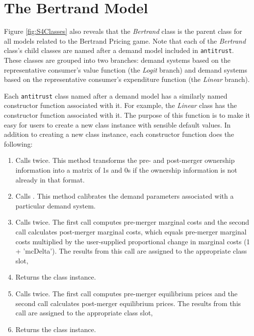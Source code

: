 \documentclass[11pt,numbers=noenddot,pointlessnumbers]{scrreprt}
\newcommand{\atr}{{\tt antitrust}}
\numberwithin{equation}{section}
\begin{document}
\section{The  Bertrand Model}
Figure \ref{fig:S4Classes} also reveals that the \emph{Bertrand} class
is the parent class for all models related to the Bertrand Pricing
game. Note that each of the \emph{Bertrand} class's
child classes are named after a demand model included in \atr{}. These
classes are grouped into two branches: demand systems based on the
representative consumer's value function (the \emph{Logit} branch) and
demand systems based on the representative consumer's expenditure
function (the \emph{Linear} branch).

Each \atr{} class named after a demand model has a similarly named
constructor function associated with it. For example, the
\emph{Linear} class has the \verb@linear@ constructor function
associated with it. The purpose of this function is to make it easy
for users to create a new class instance with sensible default
values. In addition to creating a new class instance, each constructor function does the following:

\begin{enumerate}
  \item Calls \verb@ownerToMatrix@ twice. This method transforms the
    pre- and post-merger ownership information into a matrix of 1s and
    0s if the ownership information is not already in that format.
  \item Calls \verb@calcSlopes@. This method calibrates the demand
    parameters associated with a particular demand system.
  \item Calls \verb@calcMC@ twice. The first call computes
    pre-merger marginal costs and the second call calculates
    post-merger marginal costs, which equals
    pre-merger  marginal costs multiplied by the user-supplied
    proportional change in marginal costs (1 + 'mcDelta'). The results from this call are
    assigned to the appropriate class slot,
  \item Returns the class instance.
  \item Calls \verb@calcPrices@ twice. The first call computes
    pre-merger equilibrium prices and the second call calculates
    post-merger equilibrium prices. The results from this call are
    assigned to the appropriate class slot,
  \item Returns the class instance.

\end{enumerate}
\end{document}
